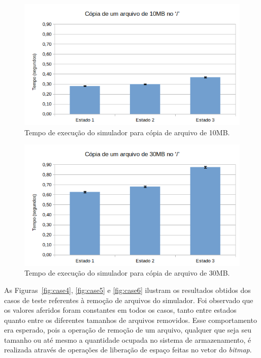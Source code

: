 \documentclass[12pt]{article}
\begin{document}
\begin{figure}[H]
	\centering
	\includegraphics[width=1\textwidth]{case2.png}
	\caption{Tempo de execução do simulador para cópia de arquivo de 10MB.}
	\label{fig:case2}
\end{figure}

\begin{figure}[H]
	\centering
	\includegraphics[width=1\textwidth]{case3.png}
	\caption{Tempo de execução do simulador para cópia de arquivo de 30MB.}
	\label{fig:case3}
\end{figure}

As Figuras~\ref{fig:case4}, \ref{fig:case5} e \ref{fig:case6} ilustram os resultados obtidos dos casos de teste referentes à remoção de arquivos do simulador. Foi observado que os valores aferidos foram constantes em todos os casos, tanto entre estados quanto entre os diferentes tamanhos de arquivos removidos. Esse comportamento era esperado, pois a operação de remoção de um arquivo, qualquer que seja seu tamanho ou até mesmo a quantidade ocupada no sistema de armazenamento, é realizada através de operações de liberação de espaço feitas no vetor do \textit{bitmap}.
\end{document}
